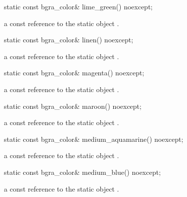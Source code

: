 \begin{itemdecl}
static const bgra_color& lime_green() noexcept;
\end{itemdecl}
\begin{itemdescr}
\pnum
\returns
a const reference to the static  object .
\end{itemdescr}

\begin{itemdecl}
static const bgra_color& linen() noexcept;
\end{itemdecl}
\begin{itemdescr}
\pnum
\returns
a const reference to the static  object .
\end{itemdescr}

\begin{itemdecl}
static const bgra_color& magenta() noexcept;
\end{itemdecl}
\begin{itemdescr}
\pnum
\returns
a const reference to the static  object .
\end{itemdescr}

\begin{itemdecl}
static const bgra_color& maroon() noexcept;
\end{itemdecl}
\begin{itemdescr}
\pnum
\returns
a const reference to the static  object .
\end{itemdescr}

\begin{itemdecl}
static const bgra_color& medium_aquamarine() noexcept;
\end{itemdecl}
\begin{itemdescr}
\pnum
\returns
a const reference to the static  object .
\end{itemdescr}

\begin{itemdecl}
static const bgra_color& medium_blue() noexcept;
\end{itemdecl}
\begin{itemdescr}
\pnum
\returns
a const reference to the static  object .
\end{itemdescr}

